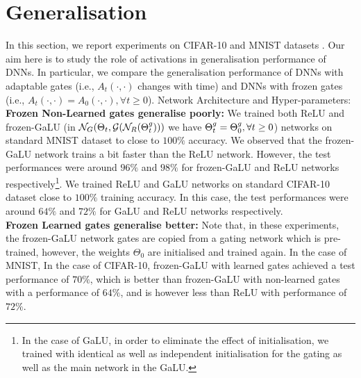 \section{Generalisation}\label{sec:generalisation}
In this section, we report experiments on CIFAR-10 and MNIST  datasets . Our aim here is to study the role of activations in generalisation performance of DNNs. In particular, we compare the generalisation performance of DNNs with adaptable gates (i.e., $A_t(\cdot,\cdot)$ changes with time) and DNNs with frozen gates (i.e., $A_t(\cdot,\cdot)=A_0(\cdot,\cdot),\forall t\geq 0$).
Network Architecture and Hyper-parameters:
\textbf{Frozen Non-Learned gates generalise poorly:} We trained both ReLU and frozen-GaLU (in $\mathcal{N}_G(\Theta_t,\mathcal{G}(\mathcal{N}_R({\Theta}^g_t)))$ we have ${\Theta}^g_t={\Theta}^g_0,\forall t\geq 0$) networks on standard MNIST dataset to close to $100\%$ accuracy. We observed that the frozen-GaLU network trains a bit faster than the ReLU network. However, the test performances were around $96\%$ and  $98\%$ for frozen-GaLU and ReLU networks respectively\footnote{In the case of GaLU, in order to eliminate the effect of initialisation, we trained with identical as well as independent initialisation for the gating as well as the main network in the GaLU. }. We trained ReLU and GaLU networks on standard CIFAR-10 dataset close to $100\%$ training accuracy. In this case, the test performances were around $64\%$ and $72\%$ for GaLU and ReLU networks respectively.\hfill\\
\textbf{Frozen Learned gates generalise better:} Note that, in these experiments, the frozen-GaLU network gates are copied from a gating network which is pre-trained, however, the weights $\Theta_0$ are initialised and trained again.  In the case of MNIST, 
In the case of CIFAR-10, frozen-GaLU with learned gates achieved a test performance of $70\%$, which is better than frozen-GaLU with non-learned gates with a performance of  $64\%$, and is however less than ReLU with performance of $72\%$. 
